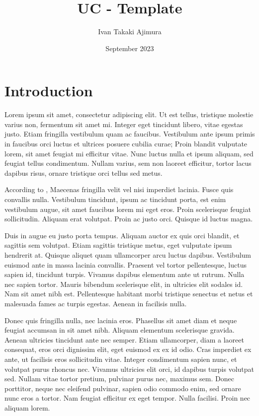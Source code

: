\documentclass[conference]{gds-review}
\title{UC - Template}
\author{Ivan Takaki Ajimura}
\date{September 2023}
\begin{document}
\maketitle

\section{Introduction}
Lorem ipsum  sit amet, consectetur adipiscing elit. Ut est tellus, tristique molestie varius non, fermentum sit amet mi. Integer eget tincidunt libero, vitae egestas justo. Etiam fringilla vestibulum quam ac faucibus. Vestibulum ante ipsum primis in faucibus orci luctus et ultrices posuere cubilia curae; Proin blandit vulputate lorem, sit amet feugiat mi efficitur vitae. Nunc luctus nulla et ipsum aliquam, sed feugiat tellus condimentum. Nullam varius, sem non laoreet efficitur, tortor lacus dapibus risus, ornare tristique orci tellus sed metus.

According to \cite{Blanchard2005}, Maecenas fringilla velit vel nisi imperdiet lacinia. Fusce quis convallis nulla. Vestibulum tincidunt, ipsum ac tincidunt porta, est enim vestibulum augue, sit amet faucibus lorem mi eget eros. Proin scelerisque feugiat sollicitudin. Aliquam erat volutpat. Proin ac justo orci. Quisque id luctus magna.

Duis in augue eu justo porta tempus. Aliquam auctor ex quis orci blandit, et sagittis sem volutpat. Etiam sagittis tristique metus, eget vulputate ipsum hendrerit at. Quisque aliquet quam ullamcorper arcu luctus dapibus. Vestibulum euismod ante in massa lacinia convallis. Praesent vel tortor pellentesque, luctus sapien id, tincidunt turpis. Vivamus dapibus elementum ante ut rutrum. Nulla nec sapien tortor. Mauris bibendum scelerisque elit, in ultricies elit sodales id. Nam sit amet nibh est. Pellentesque habitant morbi tristique senectus et netus et malesuada fames ac turpis egestas. Aenean in facilisis nulla.

Donec quis fringilla nulla, nec lacinia eros. Phasellus sit amet diam et neque feugiat accumsan in sit amet nibh. Aliquam elementum scelerisque gravida. Aenean ultricies tincidunt ante nec semper. Etiam ullamcorper, diam a laoreet consequat, eros orci dignissim elit, eget euismod ex ex id odio. Cras imperdiet ex ante, ut facilisis eros sollicitudin vitae. Integer condimentum sapien nunc, et volutpat purus rhoncus nec. Vivamus ultricies elit orci, id dapibus turpis volutpat sed. Nullam vitae tortor pretium, pulvinar purus nec, maximus sem. Donec porttitor, neque nec eleifend pulvinar, sapien odio commodo enim, sed ornare nunc eros a tortor. Nam feugiat efficitur ex eget tempor. Nulla facilisi. Proin nec aliquam lorem.
\end{document}
